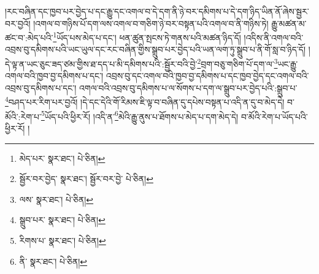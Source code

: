 །རང་བཞིན་དང་ཁྱབ་པར་བྱེད་པ་དང་རྒྱུ་དང་འགལ་བ་དེ་དག་ནི་ཉེ་བར་དམིགས་པ་དེ་དག་ཉིད་ཡིན་ནོ་ཞེས་སྦྱར་བར་བྱའོ། །འགལ་བ་གཉིས་པོ་དག་ལས་འགལ་བ་གཅིག་ཉེ་བར་བསྟན་པའི་འགལ་བ་ནི་གཉིས་ཏེ། རྒྱུ་མཚན་མ་ཚང་བ་:མེད་པའི་\footnote{མེད་པར་  སྣར་ཐང་།  པེ་ཅིན། }ཡོད་པས་མེད་པ་དང་། ཕན་ཚུན་སྤངས་ཏེ་གནས་པའི་མཚན་ཉིད་དོ། །འདིས་ནི་འགལ་བའི་འབྲས་བུ་དམིགས་པའི་ཡང་ཡུལ་དང་རང་བཞིན་གྱིས་སྒྲུབ་པར་བྱེད་པའི་ཡན་ལག་ཏུ་སྒྲུབ་པ་ནི་གོ་སླ་བ་ཉིད་དོ། །དེ་ལྟ་ན་ཡང་ཅུང་ཟད་ཙམ་གྱིས་ཐ་དད་པ་མི་དམིགས་པའི་:སྦྱོར་བའི་བྱེ་\footnote{སྦྱོར་བར་བྱེད་  སྣར་ཐང་། སྦྱོར་བར་བྱེ་  པེ་ཅིན། }བྲག་བཅུ་གཅིག་པོ་དག་ལ་\footnote{ལས་  སྣར་ཐང་།  པེ་ཅིན། }ཡང་རྒྱུ་འགལ་བའི་ཁྱབ་བྱ་དམིགས་པ་དང་། འབྲས་བུ་དང་འགལ་བའི་ཁྱབ་བྱ་དམིགས་པ་དང་ཁྱབ་བྱེད་དང་འགལ་བའི་འབྲས་བུ་དམིགས་པ་དང་། འགལ་བའི་འབྲས་བུ་དམིགས་པ་ལ་སོགས་པ་དག་ལ་སྒྲུབ་པར་བྱེད་པའི་:སྒྲུབ་པ་\footnote{སྒྲུབ་པར་  སྣར་ཐང་།  པེ་ཅིན། }བཤད་པར་རིག་པར་བྱའོ། །དེ་དང་དེའི་གོ་རིམས་ཇི་ལྟ་བ་བཞིན་དུ་དཔེས་བསྟན་པ་འདི་ན་དུ་བ་མེད་དེ། བ་མོའི་:རེག་པ་\footnote{རིགས་པ་  སྣར་ཐང་།  པེ་ཅིན། }ཡོད་པའི་ཕྱིར་རོ། །འདི་ན་\footnote{ནི་  སྣར་ཐང་།  པེ་ཅིན། }མེའི་རྒྱུ་ནུས་པ་ཐོགས་པ་མེད་པ་དག་མེད་དེ། བ་མོའི་རེག་པ་ཡོད་པའི་ཕྱིར་རོ། །
